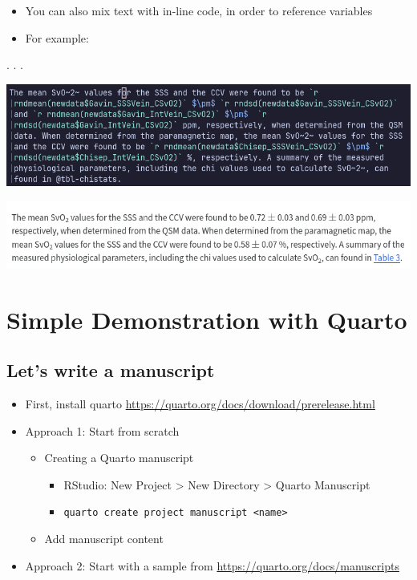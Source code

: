\documentclass[
  letterpaper,
  DIV=11,
  numbers=noendperiod]{scrartcl}
\providecommand{\tightlist}{%
  \setlength{\itemsep}{0pt}\setlength{\parskip}{0pt}}\usepackage{longtable,booktabs,array}
\begin{document}
\begin{itemize}
\item
  You can also mix text with in-line code, in order to reference
  variables
\item
  For example:
\end{itemize}

. . .

\includegraphics{img/inlinecode.png}

\includegraphics{img/inlinecode_rendered.png}

\section{Simple Demonstration with
Quarto}\label{simple-demonstration-with-quarto}

\subsection{Let's write a manuscript}\label{lets-write-a-manuscript}

\begin{itemize}
\item
  First, install quarto
  \url{https://quarto.org/docs/download/prerelease.html}
\item
  Approach 1: Start from scratch

  \begin{itemize}
  \tightlist
  \item
    Creating a Quarto manuscript

    \begin{itemize}
    \tightlist
    \item
      RStudio: New Project \textgreater{} New Directory \textgreater{}
      Quarto Manuscript
    \item
      \texttt{quarto\ create\ project\ manuscript\ \textless{}name\textgreater{}}
    \end{itemize}
  \item
    Add manuscript content
  \end{itemize}
\item
  Approach 2: Start with a sample from
  \url{https://quarto.org/docs/manuscripts}
\end{itemize}
\end{document}
